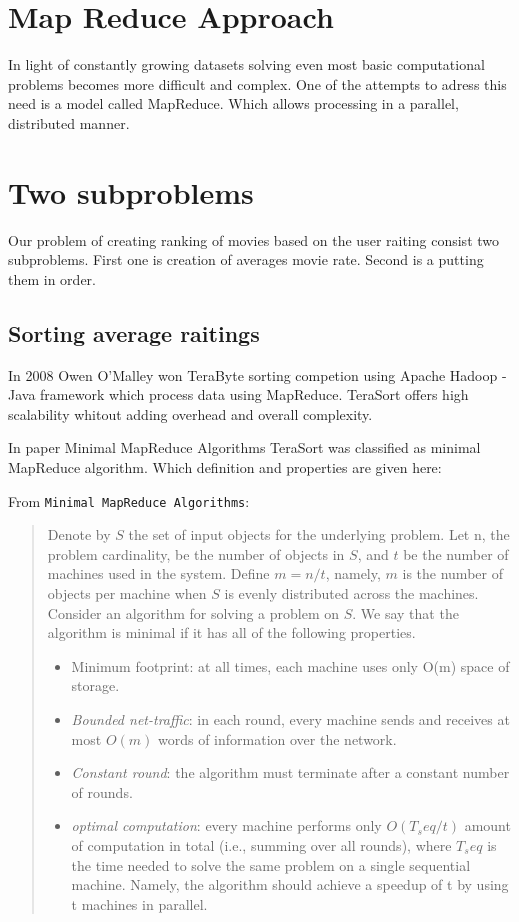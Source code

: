 \section{Map Reduce Approach}
In light of constantly growing datasets solving even 
most basic computational problems becomes more difficult and complex.
One of the attempts to adress this need is a model called MapReduce.
Which allows processing in a parallel, distributed manner.

\section{Two subproblems}
Our problem of creating ranking of movies based on the user raiting 
consist two subproblems. First one is creation of averages movie rate.
Second is a putting them in order. 


\subsection{Sorting average raitings}
In 2008 Owen O'Malley won TeraByte sorting competion using Apache Hadoop
- Java framework which process data using MapReduce. TeraSort offers
high scalability whitout adding overhead and overall complexity.

In paper Minimal MapReduce Algorithms TeraSort was classified as 
minimal MapReduce algorithm. Which definition and properties are given
here:

From \texttt{Minimal MapReduce Algorithms}:
\begin{quote}
Denote by $S$ the set of input objects 
for the underlying problem. Let n, the problem cardinality,
be the number of objects in $S$, and $t$ be the number of machines
used in the system. Define $m = n/t$, namely, $m$ is the number
of objects per machine when $S$ is evenly distributed across the
machines. Consider an algorithm for solving a problem on $S$.
We say that the algorithm is minimal if it has all of the following
properties.

\begin{itemize}
\item Minimum footprint: at all times, each machine uses only
O(m) space of storage.
\item \emph{Bounded net-traffic}: in each round, every machine sends
and receives at most $O(m)$ words of information over the
network.
\item  \emph{Constant round}: the algorithm must terminate after a
constant number of rounds.
\item \emph{optimal computation}: every machine performs only
$O(T_seq /t)$ amount of computation in total (i.e., summing
over all rounds), where $T_seq$ is the time needed to solve the
same problem on a single sequential machine. Namely, the
algorithm should achieve a speedup of t by using t machines
in parallel. 
\end{itemize}
\end{quote}


